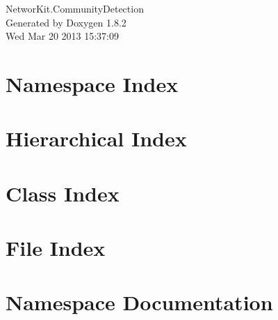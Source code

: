 \documentclass{book}
\begin{document}
\hypersetup{pageanchor=false,citecolor=blue}
\begin{titlepage}
\vspace*{7cm}
\begin{center}
{\Large Networ\-Kit.\-Community\-Detection }\\
\vspace*{1cm}
{\large Generated by Doxygen 1.8.2}\\
\vspace*{0.5cm}
{\small Wed Mar 20 2013 15:37:09}\\
\end{center}
\end{titlepage}
\clearemptydoublepage
{}
\tableofcontents
\clearemptydoublepage
{}
\hypersetup{pageanchor=true,citecolor=blue}
\chapter{Namespace Index}

\chapter{Hierarchical Index}

\chapter{Class Index}

\chapter{File Index}

\chapter{Namespace Documentation}



\end{document}
